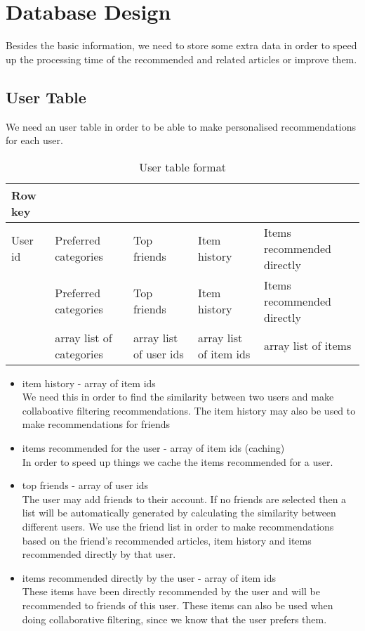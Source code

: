 \section{Database Design}
\label{sec:database-design}
Besides the basic information, we need to store some extra data in order to speed up the processing time of the recommended and related articles or improve them.

\subsection{User Table}
\label{sec:users-table}
We need an user table in order to be able to make personalised recommendations for each user.

\begin{table}[h]
\centering
\caption{User table format}
\label{user-table-format}
\begin{tabular}{@{}lllll@{}}
Row key & & & & \\ \toprule
User id & Preferred categories & Top friends & Item history & Items recommended directly  \\ 
        & Preferred categories & Top friends & Item history & Items recommended directly \\ 
        & array list of categories & array list of user ids & array  list of item ids & array list of items\\ 
\end{tabular}
\end{table}

\begin{itemize}
	\item item history - array of item ids
		\\ We need this in order to find the similarity between two users and make collaboative filtering recommendations.
		The item history may also be used to make recommendations for friends
	\item items recommended for the user - array of item ids (caching)
		\\ In order to speed up things we cache the items recommended for a user.	
	\item top friends - array of user ids
		\\ The user may add friends to their account. If no friends are selected then a list will be automatically generated by calculating the similarity between different users.
		We use the friend list in order to make recommendations based on the friend's recommended articles, item history and items recommended directly by that user. 
	\item items recommended directly by the user - array of item ids
		\\ These items have been directly recommended by the user and will be recommended to friends of this user.
		These items can also be used when doing collaborative filtering, since we know that the user prefers them.
\end{itemize}

